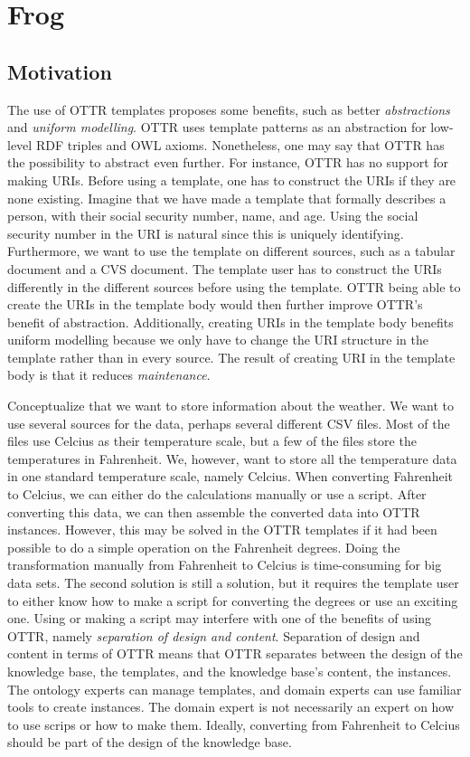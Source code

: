 \section{Frog}

\subsection{Motivation}
The use of OTTR templates proposes some benefits, such as better \emph{abstractions} and \emph{uniform modelling}. OTTR uses template patterns as an abstraction for low-level RDF triples and OWL axioms. Nonetheless, one may say that OTTR has the possibility to abstract even further. For instance, OTTR has no support for making URIs. Before using a template, one has to construct the URIs if they are none existing. Imagine that we have made a template that formally describes a person, with their social security number, name, and age. Using the social security number in the URI is natural since this is uniquely identifying. Furthermore, we want to use the template on different sources, such as a tabular document and a CVS document. The template user has to construct the URIs differently in the different sources before using the template. OTTR being able to create the URIs in the template body would then further improve OTTR's benefit of abstraction. Additionally, creating URIs in the template body benefits uniform modelling because we only have to change the URI structure in the template rather than in every source. The result of creating URI in the template body is that it reduces \emph{maintenance}.

\para
Conceptualize that we want to store information about the weather. We want to use several sources for the data, perhaps several different CSV files. Most of the files use Celcius as their temperature scale, but a few of the files store the temperatures in Fahrenheit. We, however, want to store all the temperature data in one standard temperature scale, namely Celcius. When converting Fahrenheit to Celcius, we can either do the calculations manually or use a script. After converting this data, we can then assemble the converted data into OTTR instances. However, this may be solved in the OTTR templates if it had been possible to do a simple operation on the Fahrenheit degrees. Doing the transformation manually from Fahrenheit to Celcius is time-consuming for big data sets. The second solution is still a solution, but it requires the template user to either know how to make a script for converting the degrees or use an exciting one. Using or making a script may interfere with one of the benefits of using OTTR, namely \emph{separation of design and content}. Separation of design and content in terms of OTTR means that OTTR separates between the design of the knowledge base, the templates, and the knowledge base's content, the instances. The ontology experts can manage templates, and domain experts can use familiar tools to create instances. The domain expert is not necessarily an expert on how to use scrips or how to make them. Ideally, converting from Fahrenheit to Celcius should be part of the design of the knowledge base.  

